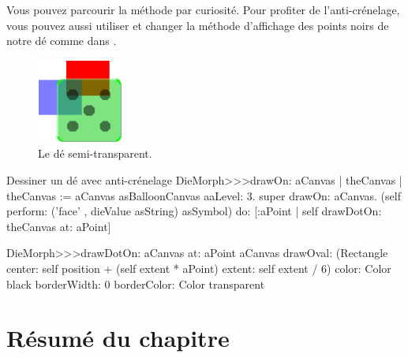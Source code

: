 \documentclass[a4paper,10pt,twoside]{book}
\begin{document}
Vous pouvez parcourir la m\'ethode
 par curiosit\'e.
Pour profiter de l'anti-cr\'enelage, vous pouvez aussi utiliser
 et changer la m\'ethode d'affichage des points
noirs de notre d\'e comme dans .

\begin{figure}[ht]
	\centerline{\includegraphics[scale=0.7]{multiMorphs}}
	\caption{Le d\'e semi-transparent.\label{fig:multiMorphs}}
\end{figure}

\begin{methods}[aadie]{Dessiner un d\'e avec anti-cr\'enelage}
DieMorph>>>drawOn: aCanvas
	| theCanvas |
	theCanvas := aCanvas asBalloonCanvas aaLevel: 3.
	super drawOn: aCanvas.
	(self perform: ('face' , dieValue asString) asSymbol)
		do: [:aPoint | self drawDotOn: theCanvas at: aPoint]

DieMorph>>>drawDotOn: aCanvas at: aPoint
	aCanvas
		drawOval: (Rectangle
			center: self position + (self extent * aPoint)
			extent: self extent / 6)
		color: Color black
		borderWidth: 0
		borderColor: Color transparent
\end{methods}

\section{R\'esum\'e du chapitre}
\end{document}
